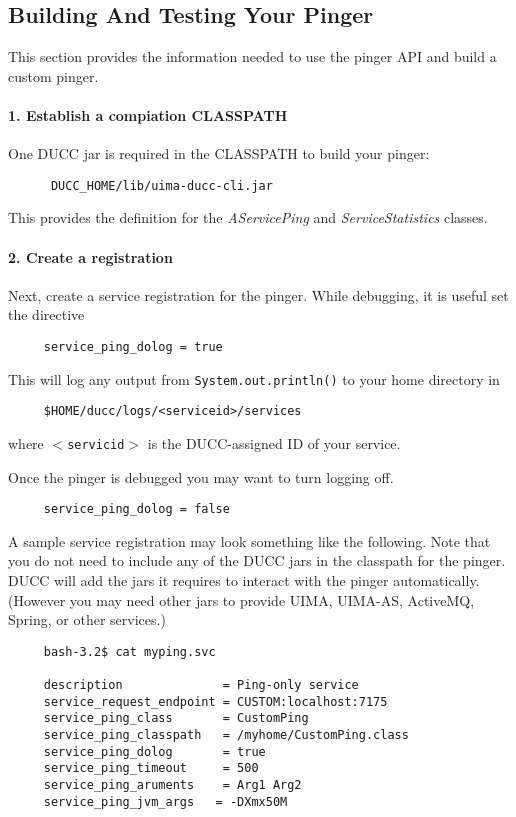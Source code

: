      \subsection{Building And Testing Your Pinger}
      This section provides the information needed to use the pinger API and build a
      custom pinger. 

      \paragraph{1. Establish a compiation CLASSPATH} One DUCC jar is required in the CLASSPATH to build your pinger:
\begin{verbatim}
      DUCC_HOME/lib/uima-ducc-cli.jar
\end{verbatim}      
      This provides the definition for the {\em AServicePing} and {\em ServiceStatistics} classes.

      \paragraph{2. Create a registration}Next, create a service registration for the pinger.  While
      debugging, it is useful set the directive
\begin{verbatim}
     service_ping_dolog = true
\end{verbatim}
      This will log any output from  {\tt System.out.println()} to your home directory in
\begin{verbatim}
     $HOME/ducc/logs/<serviceid>/services
\end{verbatim}
      where {\tt$<$servicid$>$} is the DUCC-assigned ID of your service.

      Once the pinger is debugged you may want to turn logging off.
\begin{verbatim}
     service_ping_dolog = false
\end{verbatim}
      
      A sample service registration may look something like the following.  Note that you do not need
      to include any of the DUCC jars in the classpath for the pinger.  DUCC will add the jars it
      requires to interact with the pinger automatically.  (However you may need other jars to
      provide UIMA, UIMA-AS, ActiveMQ, Spring, or other services.)
\begin{verbatim}
     bash-3.2$ cat myping.svc

     description              = Ping-only service
     service_request_endpoint = CUSTOM:localhost:7175
     service_ping_class       = CustomPing
     service_ping_classpath   = /myhome/CustomPing.class
     service_ping_dolog       = true
     service_ping_timeout     = 500
     service_ping_aruments    = Arg1 Arg2
     service_ping_jvm_args   = -DXmx50M
\end{verbatim}
       
